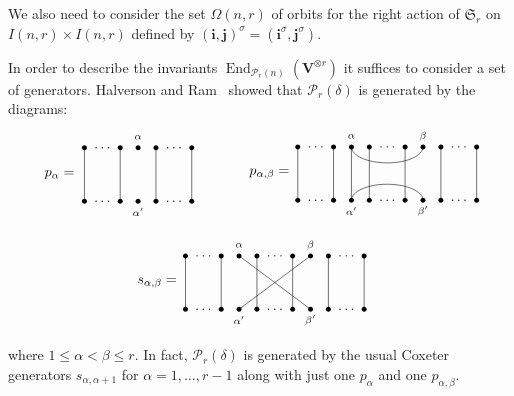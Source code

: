 \documentclass[ALCO,ThmDefs,Unicode,epreuves]{cedram}
\DeclareMathOperator{\End}{End}
\newcommand{\Sym}{\mathfrak{S}}
\newcommand{\Ptn}{\mathcal{P}}
\newcommand{\bi}{{\boldsymbol{i}}} %
\newcommand{\bj}{{\boldsymbol{j}}}
\newcommand{\V}{\mathbf{V}} %
\begin{document}
We also need to consider the set $\Omega(n,r)$ of orbits for the right
action of $\Sym_r$ on $I(n,r) \times I(n,r)$ defined by
$(\bi, \bj)^\sigma = (\bi^\sigma, \bj^\sigma)$.

In order to describe the invariants $\End_{\Ptn_r(n)}(\V^{\otimes r})$
it suffices to consider a set of generators. Halverson and Ram~\cite{HR-2005} 
showed that $\Ptn_r(\delta)$ is generated by the
diagrams:
\[
\begin{tikzpicture}[scale=0.45]
	\draw (-1,1.5) node {$p_\alpha=\quad$};
	\foreach \x in {0,2,3,4,6}
	{\fill[black] (\x,0) circle (4pt);
	\fill[black] (\x,3) circle (4pt);}
	\foreach \x in {0,2,4,6}
	{\draw (\x,3)--(\x,0);}
	\draw (3,3.6) node {$\scriptstyle\alpha$};
	\draw (3,-0.6) node {$\scriptstyle\alpha'$};
\draw (1,0) node {$\ldots$};\draw (1,3) node {$\ldots$};
\draw (5,0) node {$\ldots$};\draw (5,3) node {$\ldots$};
\end{tikzpicture}
\hspace{0.5in}
\begin{tikzpicture}[scale=0.45]
	\draw (-1.2,1.5) node {$p_{\alpha,\beta}=\quad$};
	\foreach \x in {0,2,3,4, 5.5+.5,6.5+.5,8,10}
	{\fill[black] (\x,0) circle (4pt);
	\fill[black] (\x,3) circle (4pt);}
	\foreach \x in {0,2,4, 5.5+.5,7.5+.5,10}%
	{\draw (\x,3)--(\x,0);}
	\draw (3,3)--(3,0); \draw (3,3) arc (0:180:-2 and -0.9) ;
 \draw (3,0) arc (0:180:-2 and 0.9) ;
	\draw (3,3.6) node {$\scriptstyle\alpha$};\draw (7,3.6)
 node {$\scriptstyle\beta$};
	\draw (3,-0.6) node {$\scriptstyle\alpha'$};\draw (7,-0.6)
 node {$\scriptstyle\beta'$};
\draw (1,3) node {$\ldots$};\draw (1,0) node {$\ldots$};
\draw (5,3) node {$\ldots$};\draw (5,0) node {$\ldots$};
\draw (9,3) node {$\ldots$};\draw (9,0) node {$\ldots$};
\end{tikzpicture}
\]
\[
\begin{tikzpicture}[scale=0.45]
	\draw (-1.2,1.5) node {$s_{\alpha,\beta}=\quad$};
	\foreach \x in {0,2,3,4, 5.5+.5,6.5+.5,8,10}
	{\fill[black] (\x,0) circle (4pt);
	\fill[black] (\x,3) circle (4pt);}
	\foreach \x in {0,2,4, 5.5+.5,7.5+.5,10}%
	{\draw (\x,3)--(\x,0);}
	\draw (3,3)--(7,0);\draw (7,3)--(3,0);
	\draw (3,3.6) node {$\scriptstyle\alpha$};\draw (7,3.6)
 node {$\scriptstyle\beta$};
	\draw (3,-0.6) node {$\scriptstyle\alpha'$};\draw (7,-0.6)
 node {$\scriptstyle\beta'$};
\draw (1,3) node {$\ldots$};\draw (1,0) node {$\ldots$};
\draw (5,3) node {$\ldots$};\draw (5,0) node {$\ldots$};
\draw (9,3) node {$\ldots$};\draw (9,0) node {$\ldots$};
\end{tikzpicture}\hspace{0.5cm}
\]
where $1 \leq \alpha<\beta \leq r$. In fact, $\Ptn_r(\delta)$ is
generated by the usual Coxeter generators $s_{\alpha,\alpha+1}$ for
$\alpha = 1, \dots, r-1$ along with just one $p_\alpha$ and one
$p_{\alpha,\beta}$.
\end{document}
